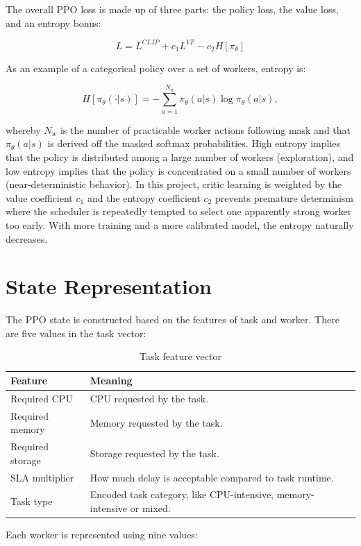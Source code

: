 The overall PPO loss is made up of three parts: the policy loss, the value loss, and an entropy bonus:

\[
L = L^{CLIP} + c_1 L^{VF} - c_2 H[\pi_\theta]
\]

As an example of a categorical policy over a set of workers, entropy is:

\[
H[\pi_\theta(\cdot|s)] = -\sum_{a=1}^{N_w}\pi_\theta(a|s)\log\pi_\theta(a|s),
\]

whereby \(N_w\) is the number of practicable worker actions following mask and that \(\pi_\theta(a|s)\) is derived off the masked softmax probabilities. High entropy implies that the policy is distributed among a large number of workers (exploration), and low entropy implies that the policy is concentrated on a small number of workers (near-deterministic behavior). In this project, critic learning is weighted by the value coefficient \(c_1\) and the entropy coefficient \(c_2\) prevents premature determinism where the scheduler is repeatedly tempted to select one apparently strong worker too early. With more training and a more calibrated model, the entropy naturally decreases.

\section{State Representation}

The PPO state is constructed based on the features of task and worker. There are five values in the task vector:

\begin{table}[H]
\centering
\caption{Task feature vector}
\label{tab:task_features}
\begin{tabularx}{\textwidth}{lX}
\toprule
\textbf{Feature} & \textbf{Meaning} \\
\midrule
Required CPU & CPU requested by the task. \\
Required memory & Memory requested by the task. \\
Required storage & Storage requested by the task. \\
SLA multiplier & How much delay is acceptable compared to task runtime. \\
Task type & Encoded task category, like CPU-intensive, memory-intensive or mixed. \\
\bottomrule
\end{tabularx}
\end{table}

Each worker is represented using nine values:

